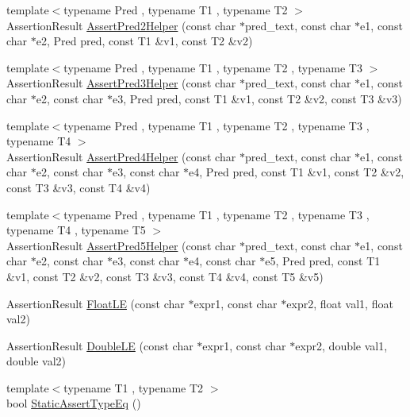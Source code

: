 \begin{DoxyCompactItemize}
\item 
{\footnotesize template$<$typename Pred , typename T1 , typename T2 $>$ }\\\-Assertion\-Result \hyperlink{namespacetesting_aa6587938029dd8733ecb885068f08247}{\-Assert\-Pred2\-Helper} (const char $\ast$pred\-\_\-text, const char $\ast$e1, const char $\ast$e2, \-Pred pred, const \-T1 \&v1, const \-T2 \&v2)
\item 
{\footnotesize template$<$typename Pred , typename T1 , typename T2 , typename T3 $>$ }\\\-Assertion\-Result \hyperlink{namespacetesting_ac92dcbd00a0ffb2913e65d286e321a22}{\-Assert\-Pred3\-Helper} (const char $\ast$pred\-\_\-text, const char $\ast$e1, const char $\ast$e2, const char $\ast$e3, \-Pred pred, const \-T1 \&v1, const \-T2 \&v2, const \-T3 \&v3)
\item 
{\footnotesize template$<$typename Pred , typename T1 , typename T2 , typename T3 , typename T4 $>$ }\\\-Assertion\-Result \hyperlink{namespacetesting_ae90c778d69db4682e8fd8baaa0a9f9cd}{\-Assert\-Pred4\-Helper} (const char $\ast$pred\-\_\-text, const char $\ast$e1, const char $\ast$e2, const char $\ast$e3, const char $\ast$e4, \-Pred pred, const \-T1 \&v1, const \-T2 \&v2, const \-T3 \&v3, const \-T4 \&v4)
\item 
{\footnotesize template$<$typename Pred , typename T1 , typename T2 , typename T3 , typename T4 , typename T5 $>$ }\\\-Assertion\-Result \hyperlink{namespacetesting_addcf52b273ce17269cbf4956cfe600a6}{\-Assert\-Pred5\-Helper} (const char $\ast$pred\-\_\-text, const char $\ast$e1, const char $\ast$e2, const char $\ast$e3, const char $\ast$e4, const char $\ast$e5, \-Pred pred, const \-T1 \&v1, const \-T2 \&v2, const \-T3 \&v3, const \-T4 \&v4, const \-T5 \&v5)
\item 
\-Assertion\-Result \hyperlink{namespacetesting_a23a2d15c37bf756a5baf67922ad35172}{\-Float\-L\-E} (const char $\ast$expr1, const char $\ast$expr2, float val1, float val2)
\item 
\-Assertion\-Result \hyperlink{namespacetesting_aa02480b781912f18f8b22ab91a905d58}{\-Double\-L\-E} (const char $\ast$expr1, const char $\ast$expr2, double val1, double val2)
\item 
{\footnotesize template$<$typename T1 , typename T2 $>$ }\\bool \hyperlink{namespacetesting_a5539306cf8f984daed507af0324b77bc}{\-Static\-Assert\-Type\-Eq} ()
\end{DoxyCompactItemize}

